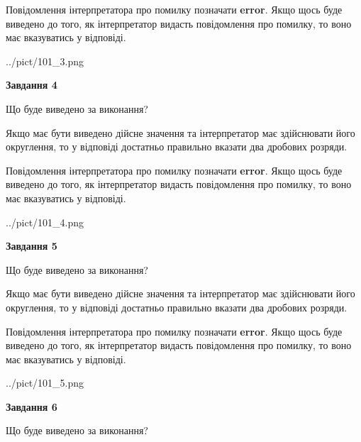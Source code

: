 \documentclass[12pt, ukrainian]{article}
\begin{document}
{\begin {Large}
Повідомлення інтерпретатора про помилку позначати \textbf{error}.
Якщо щось буде виведено до того, як інтерпретатор видасть повідомлення про помилку, 
то воно має вказуватись у відповіді. \par

\begin{center}
	{../pict/101_3.png}
\end{center}
\newpage

{\begin {center}\textbf{Завдання 4}\end {center}}\par
Що буде виведено за виконання? \par

Якщо має бути виведено дійсне значення та інтерпретатор має здійснювати його округлення, 
то у відповіді достатньо правильно вказати два дробових розряди.

Повідомлення інтерпретатора про помилку позначати \textbf{error}.
Якщо щось буде виведено до того, як інтерпретатор видасть повідомлення про помилку, 
то воно має вказуватись у відповіді. \par

\begin{center}
	{../pict/101_4.png}
\end{center}
\newpage

{\begin {center}\textbf{Завдання 5}\end {center}}\par
Що буде виведено за виконання? \par

Якщо має бути виведено дійсне значення та інтерпретатор має здійснювати його округлення, 
то у відповіді достатньо правильно вказати два дробових розряди.

Повідомлення інтерпретатора про помилку позначати \textbf{error}.
Якщо щось буде виведено до того, як інтерпретатор видасть повідомлення про помилку, 
то воно має вказуватись у відповіді. \par

\begin{center}
	{../pict/101_5.png}
\end{center}
\newpage

{\begin {center}\textbf{Завдання 6}\end {center}}\par
Що буде виведено за виконання? \par


\end{Large}}
\end{document}
